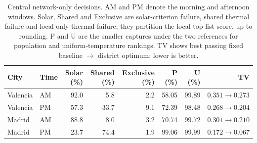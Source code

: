 \begin{table}[htbp]\centering\footnotesize
\caption{Central network-only decisions. AM and PM denote the morning and afternoon windows. Solar, Shared and Exclusive are solar-criterion failure, shared thermal failure and local-only thermal failure; they partition the local top-list score, up to rounding. P and U are the smaller captures under the two references for population and uniform-temperature rankings. TV shows best passing fixed baseline $\rightarrow$ district optimum; lower is better.}\label{tab:mechanisms}
\setlength{\tabcolsep}{3pt}\begin{tabular}{llrrrrrr}
\toprule City & Time & Solar (\%) & Shared (\%) & Exclusive (\%) & P (\%) & U (\%) & TV\\\midrule
Valencia & AM & 92.0 & 5.8 & 2.2 & 58.05 & 99.89 & $0.351\!\rightarrow\!0.273$\\
Valencia & PM & 57.3 & 33.7 & 9.1 & 72.39 & 98.48 & $0.268\!\rightarrow\!0.204$\\
Madrid & AM & 88.8 & 8.0 & 3.2 & 70.74 & 99.72 & $0.301\!\rightarrow\!0.210$\\
Madrid & PM & 23.7 & 74.4 & 1.9 & 99.06 & 99.99 & $0.172\!\rightarrow\!0.067$\\
\bottomrule\end{tabular}\end{table}